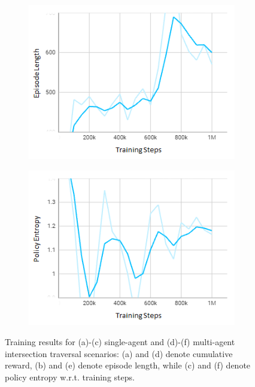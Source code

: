 \documentclass[letterpaper, 10 pt, conference]{ieeeconf}  %
\begin{document}
\begin{figure}[t]
\begin{subfigure}[b]{0.16\linewidth}
			\includegraphics[width=\linewidth]{Fig5e.png}
			\caption{}
			\label{fig5e}
		\end{subfigure}
		\hfill
		\begin{subfigure}[b]{0.16\linewidth}
			\centering
			\includegraphics[width=\linewidth]{Fig5f.png}
			\caption{}
			\label{fig5f}
		\end{subfigure}
		\caption{Training results for (a)-(c) single-agent and (d)-(f) multi-agent intersection traversal scenarios: (a) and (d) denote cumulative reward, (b) and (e) denote episode length, while (c) and (f) denote policy entropy w.r.t. training steps.}
		\label{fig5}
	\end{figure}
	
\end{document}
